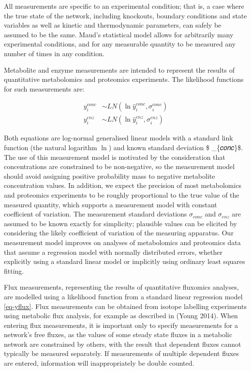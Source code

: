 \documentclass[journal=asbcd6,manuscript=article,layout=traditional]{achemso}
\begin{document}
All measurements are specific to an experimental condition; that is, a
case where the true state of the network, including knockouts, boundary
conditions and state variables as well as kinetic and thermodynamic
parameters, can safely be assumed to be the same. Maud's statistical
model allows for arbitrarily many experimental conditions, and for any
measurable quantity to be measured any number of times in any condition.

Metabolite and enzyme measurements are intended to represent the results
of quantitative metabolomics and proteomics experiments. The likelihood
functions for such measurements are:

\begin{align}
y_i^{conc} &\sim LN(\ln{\hat{y}_i^{conc}}, \sigma_i^{conc})\label{eq-yconc} \\
y_i^{enz} &\sim LN(\ln{\hat{y}_i^{enz}}, \sigma_i^{enz})\label{eq-yenz}
\end{align}

Both equations are log-normal generalised linear models with a standard
link function (the natural logarithm \(\ln\)) and known standard
deviation \$ \sigma\_\{𝑐𝑜𝑛𝑐\}\$. The use of this measurement model is
motivated by the consideration that concentrations are constrained to be
non-negative, so the measurement model should avoid assigning positive
probability mass to negative metabolite concentration values. In
addition, we expect the precision of most metabolomics and proteomics
experiments to be roughly proportional to the true value of the measured
quantity, which supports a measurement model with constant coefficient
of variation. The measurement standard deviations \(\sigma_{𝑐𝑜𝑛𝑐}\) and
\(\sigma_{𝑒𝑛𝑧}\) are assumed to be known exactly for simplicity;
plausible values can be elicited by considering the likely coefficient
of variation of the measuring apparatus. Our measurement model improves
on analyses of metabolomics and proteomics data that assume a regression
model with normally distributed errors, whether explicitly using a
standard linear model or implicitly using ordinary least squares
fitting.

Flux measurements, representing the results of quantitative fluxomics
analyses, are modelled using a likelihood function from a standard
linear regression model \eqref{eq-yflux}. Flux measurements can be
obtained from isotope labelling experiments using metabolic flux
analysis, for example as described in (Young 2014). When entering flux
measurements, it is important only to specify measurements for a
network's free fluxes, as the values of some steady state fluxes in a
metabolic network are constrained by others, with the result that
dependent fluxes cannot typically be measured separately. If
measurements of multiple dependent fluxes are entered, information will
inappropriately be double counted.
\end{document}
